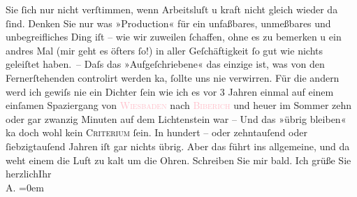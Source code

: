                     Sie ſich nur nicht verſtimmen, wenn {\pb}Arbeitsluſt u
                    kraft nicht gleich wieder da ſind. Denken Sie nur was »Production« für ein
                    unfaßbares, unmeßbares und unbegreifliches Ding iſt – wie wir zuweilen ſchaffen,
                    ohne es zu bemerken u ein andres Mal (mir geht es öfters ſo!) in aller
                    Geſchäftigkeit ſo gut wie nichts geleiſtet haben. – Daſs das »Aufgeſchriebene«
                    das einzige ist, was von den Fernerſtehenden controlirt werden ka{\geminationn}, ſollte uns nie verwirren. Für die {\pb}andern werd ich gewiſs nie ein Dichter ſein wie ich
                    es vor 3 Jahren einmal auf einem einſamen Spaziergang von \textsc{\textcolor{pink}{Wiesbaden}{}\ledrightnote{\textcolor{pink}{Wiesbaden}}} nach \textcolor{pink}{\textsc{Biberich}}{}\ledrightnote{\textcolor{pink}{Biebrich}} und heuer im Sommer zehn oder gar zwanzig Minuten auf dem Lichtenstein war – Und das »übrig bleiben« ka{\geminationn} doch wohl kein \textsc{Criterium}{ }ſein. In hundert – oder zehntauſend oder
                    ſiebzigtauſend Jahren iſt gar nichts {\pb}übrig.\pend
           \pstart
           Aber das führt ins allgemeine, und da weht einem die Luft zu kalt um die
                    Ohren.\pend
           \pstart
           Schreiben Sie mir bald. Ich grüße Sie herzlich\hspace*{1.5em}Ihr{\\[\baselineskip]}\spacefill\mbox{A.}\pend
           \leftskip=0em{}\endnumbering{}  
      